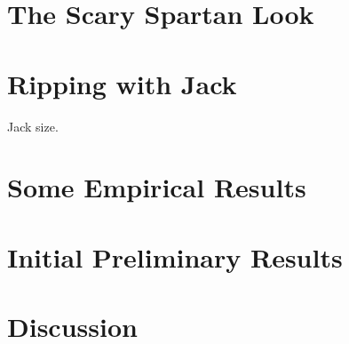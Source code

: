 \documentclass[preprint,10pt,nonatbib]{sigplanconf}
\begin{document}
\section{The Scary Spartan Look}
\label{section:look}


\section{Ripping with Jack}
\label{section:jack}

Jack size.

\section{Some Empirical Results}
\label{section:look}


\section{Initial Preliminary Results}
\label{section:initial}


\section{Discussion}
\label{section:zz}


\small

\end{document}
